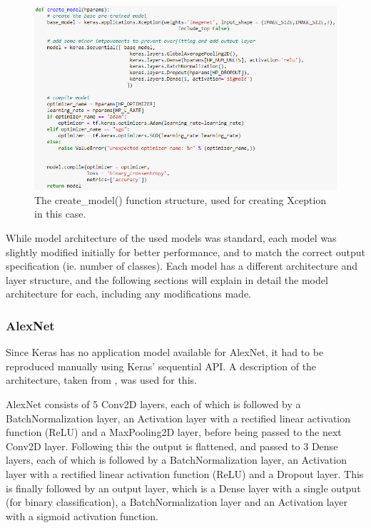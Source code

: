 \begin{figure}[H]
    \centering
    \includegraphics[width=\textwidth]{figures/xception-model.png}
    \caption{The create\_model() function structure, used for creating Xception in this case.}
    \label{fig:createmodel-function}
\end{figure}

While model architecture of the used models was standard, each model was slightly modified initially for better performance, and to match the correct output specification (ie. number of classes). Each model has a different architecture and layer structure, and the following sections will explain in detail the model architecture for each, including any modifications made.

\subsubsection{AlexNet}
Since Keras has no application model available for AlexNet, it had to be reproduced manually using Keras' sequential API. A description of the architecture, taken from \cite{krizhevsky2012imagenet}, was used for this.

AlexNet consists of 5 Conv2D layers, each of which is followed by a BatchNormalization layer, an Activation layer with a rectified linear activation function (ReLU) and a MaxPooling2D layer, before being passed to the next Conv2D layer. Following this the output is flattened, and passed to 3 Dense layers, each of which is followed by a BatchNormalization layer, an Activation layer with a rectified linear activation function (ReLU) and a Dropout layer. This is finally followed by an output layer, which is a Dense layer with a single output (for binary classification), a BatchNormalization layer and an Activation layer with a sigmoid activation function.

